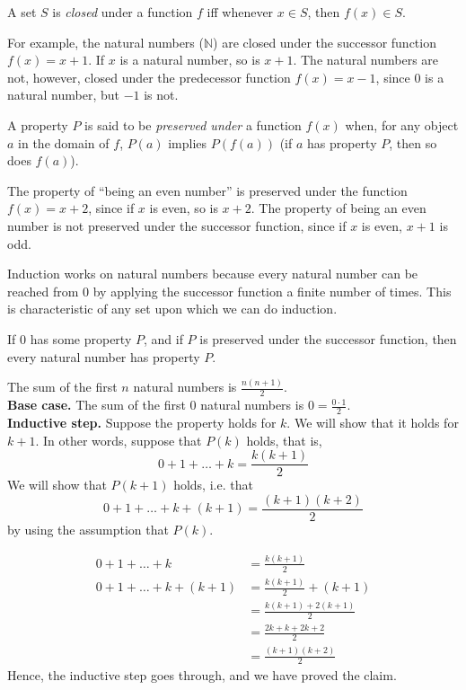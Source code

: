 \documentclass[../../include/open-logic-section]{subfiles}
\begin{document}
\begin{defn}
A set $S$ is \emph{closed} under a function $f$ iff whenever $x \in S$, then $f(x) \in S$.
\end{defn}

\begin{explain}
For example, the natural numbers ($\mathbb{N}$) are closed under the successor 
function $f(x) = x+1$. If $x$ is a natural number, so is $x+1$. The natural numbers 
are not, however, closed under the predecessor function $f(x) = x-1$, since $0$ is a 
natural number, but $-1$ is not.
\end{explain}

\begin{defn}
A property $P$ is said to be \emph{preserved under} a function $f(x)$ when, for any
object $a$ in the domain of $f$, $P(a)$ implies $P(f(a))$ (if $a$ has property $P$, then 
so does $f(a)$).
\end{defn}

\begin{explain}
The property of ``being an even number'' is preserved under the function $f(x) = x+2$, 
since if $x$ is even, so is $x+2$. The property of being an even number is not preserved 
under the successor function, since if $x$ is even, $x+1$ is odd.

Induction works on natural numbers because every natural number can be 
reached from 0 by applying the successor function a finite number of times. This is 
characteristic of any set upon which we can do induction.
\end{explain}

\begin{defn}
If 0 has some property $P$, and if $P$ is preserved under the successor function, then
every natural number has property $P$.
\end{defn}

\begin{ex} The sum of the first $n$ natural numbers is $\frac{n(n+1)}{2}$. \\

\textbf{Base case.} The sum of the first 0 natural numbers is $0= \frac{0\cdot 1}{2}$.\\

\textbf{Inductive step.} Suppose the property holds for $k$. We will show that it holds 
for $k+1$. In other words, suppose that $P(k)$ holds, that is,
\[ 0 + 1 + \ldots + k = \frac{k(k+1)}{2} \]
We will show that $P(k+1)$ holds, i.e. that
\[ 0 + 1 + \ldots + k + (k+1) = \frac{(k+1)(k+2)}{2} \]
by using the assumption that $P(k)$.

\begin{align*}
0 + 1 + \ldots + k &= \frac{k(k+1)}{2} \tag{Assumption} \\
0 + 1 + \ldots + k + (k+1) &= \frac{k(k+1)}{2} + (k+1) \tag{Add $k+1$ to both sides} \\
&= \frac{k(k+1) + 2(k+1)}{2} \\
&= \frac{2k + k + 2k +2}{2} \\
&=\frac{(k+1)(k+2)}{2}
\end{align*}
Hence, the inductive step goes through, and we have proved the claim.
\end{ex}
\end{document}
